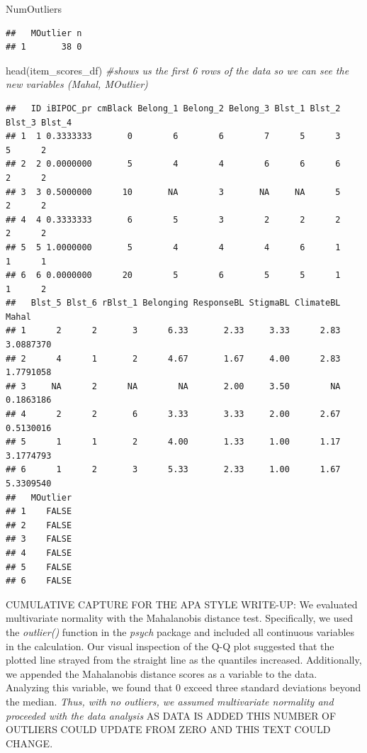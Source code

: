 \documentclass[
  english,
]{book}
\newenvironment{Shaded}{\begin{snugshade}}{\end{snugshade}}
\newcommand{\CommentTok}[1]{\textcolor[rgb]{0.56,0.35,0.01}{\textit{#1}}}
\newcommand{\FunctionTok}[1]{\textcolor[rgb]{0.00,0.00,0.00}{#1}}
\newcommand{\NormalTok}[1]{#1}
\begin{document}
\begin{Shaded}
\begin{Highlighting}[]
\NormalTok{NumOutliers}
\end{Highlighting}
\end{Shaded}

\begin{verbatim}
##   MOutlier n
## 1       38 0
\end{verbatim}

\begin{Shaded}
\begin{Highlighting}[]
\FunctionTok{head}\NormalTok{(item\_scores\_df) }\CommentTok{\#shows us the first 6 rows of the data so we can see the new variables (Mahal, MOutlier)}
\end{Highlighting}
\end{Shaded}

\begin{verbatim}
##   ID iBIPOC_pr cmBlack Belong_1 Belong_2 Belong_3 Blst_1 Blst_2 Blst_3 Blst_4
## 1  1 0.3333333       0        6        6        7      5      3      5      2
## 2  2 0.0000000       5        4        4        6      6      6      2      2
## 3  3 0.5000000      10       NA        3       NA     NA      5      2      2
## 4  4 0.3333333       6        5        3        2      2      2      2      2
## 5  5 1.0000000       5        4        4        4      6      1      1      1
## 6  6 0.0000000      20        5        6        5      5      1      1      2
##   Blst_5 Blst_6 rBlst_1 Belonging ResponseBL StigmaBL ClimateBL     Mahal
## 1      2      2       3      6.33       2.33     3.33      2.83 3.0887370
## 2      4      1       2      4.67       1.67     4.00      2.83 1.7791058
## 3     NA      2      NA        NA       2.00     3.50        NA 0.1863186
## 4      2      2       6      3.33       3.33     2.00      2.67 0.5130016
## 5      1      1       2      4.00       1.33     1.00      1.17 3.1774793
## 6      1      2       3      5.33       2.33     1.00      1.67 5.3309540
##   MOutlier
## 1    FALSE
## 2    FALSE
## 3    FALSE
## 4    FALSE
## 5    FALSE
## 6    FALSE
\end{verbatim}

CUMULATIVE CAPTURE FOR THE APA STYLE WRITE-UP: We evaluated multivariate normality with the Mahalanobis distance test. Specifically, we used the \emph{outlier()} function in the \emph{psych} package and included all continuous variables in the calculation. Our visual inspection of the Q-Q plot suggested that the plotted line strayed from the straight line as the quantiles increased. Additionally, we appended the Mahalanobis distance scores as a variable to the data. Analyzing this variable, we found that 0 exceed three standard deviations beyond the median. \emph{Thus, with no outliers, we assumed multivariate normality and proceeded with the data analysis} AS DATA IS ADDED THIS NUMBER OF OUTLIERS COULD UPDATE FROM ZERO AND THIS TEXT COULD CHANGE.
\end{document}
